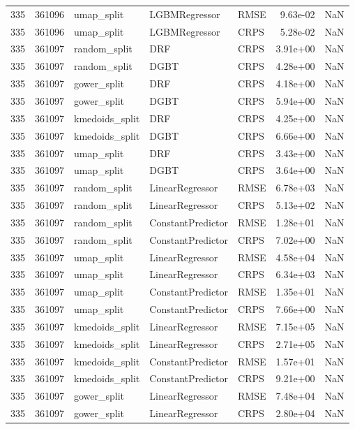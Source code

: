 \begin{tabular}{rrlllrr}
335 & 361096 & umap\_split & LGBMRegressor & RMSE & 9.63e-02 & NaN \\
335 & 361096 & umap\_split & LGBMRegressor & CRPS & 5.28e-02 & NaN \\
335 & 361097 & random\_split & DRF & CRPS & 3.91e+00 & NaN \\
335 & 361097 & random\_split & DGBT & CRPS & 4.28e+00 & NaN \\
335 & 361097 & gower\_split & DRF & CRPS & 4.18e+00 & NaN \\
335 & 361097 & gower\_split & DGBT & CRPS & 5.94e+00 & NaN \\
335 & 361097 & kmedoids\_split & DRF & CRPS & 4.25e+00 & NaN \\
335 & 361097 & kmedoids\_split & DGBT & CRPS & 6.66e+00 & NaN \\
335 & 361097 & umap\_split & DRF & CRPS & 3.43e+00 & NaN \\
335 & 361097 & umap\_split & DGBT & CRPS & 3.64e+00 & NaN \\
335 & 361097 & random\_split & LinearRegressor & RMSE & 6.78e+03 & NaN \\
335 & 361097 & random\_split & LinearRegressor & CRPS & 5.13e+02 & NaN \\
335 & 361097 & random\_split & ConstantPredictor & RMSE & 1.28e+01 & NaN \\
335 & 361097 & random\_split & ConstantPredictor & CRPS & 7.02e+00 & NaN \\
335 & 361097 & umap\_split & LinearRegressor & RMSE & 4.58e+04 & NaN \\
335 & 361097 & umap\_split & LinearRegressor & CRPS & 6.34e+03 & NaN \\
335 & 361097 & umap\_split & ConstantPredictor & RMSE & 1.35e+01 & NaN \\
335 & 361097 & umap\_split & ConstantPredictor & CRPS & 7.66e+00 & NaN \\
335 & 361097 & kmedoids\_split & LinearRegressor & RMSE & 7.15e+05 & NaN \\
335 & 361097 & kmedoids\_split & LinearRegressor & CRPS & 2.71e+05 & NaN \\
335 & 361097 & kmedoids\_split & ConstantPredictor & RMSE & 1.57e+01 & NaN \\
335 & 361097 & kmedoids\_split & ConstantPredictor & CRPS & 9.21e+00 & NaN \\
335 & 361097 & gower\_split & LinearRegressor & RMSE & 7.48e+04 & NaN \\
335 & 361097 & gower\_split & LinearRegressor & CRPS & 2.80e+04 & NaN \\

\end{tabular}
